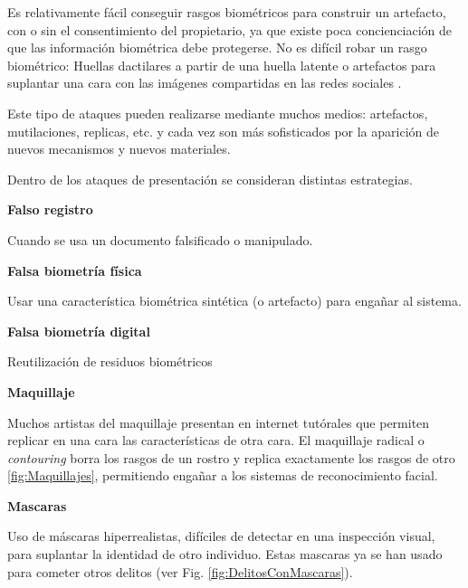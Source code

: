 Es relativamente fácil conseguir rasgos biométricos para construir un artefacto, con o sin el consentimiento del propietario, ya que existe poca concienciación de que las información biométrica debe protegerse. No es difícil robar un rasgo biométrico: Huellas dactilares a partir de una huella latente o artefactos para suplantar una cara con las imágenes compartidas en las redes sociales \cite{xu2016virtual}.

Este tipo de ataques pueden realizarse mediante muchos medios: artefactos, mutilaciones, replicas, etc. y cada vez son más sofisticados por la aparición de nuevos mecanismos y nuevos materiales.

Dentro de los ataques de presentación se consideran distintas estrategias.

\textbf{Falso registro}

Cuando se usa un documento falsificado o manipulado. 

\textbf{Falsa biometría física}

Usar una característica biométrica sintética (o artefacto) para engañar al sistema.

\textbf{Falsa biometría digital}

Reutilización de residuos biométricos 

\textbf{Maquillaje}

 Muchos artistas del maquillaje presentan en internet tutórales que permiten replicar en una cara las características de otra cara. El maquillaje radical o \textit{contouring} borra los rasgos de un rostro y replica exactamente los rasgos de otro \ref{fig:Maquillajes}, permitiendo engañar a los sistemas de reconocimiento \gls{facial}.  

\textbf{Mascaras}

Uso de máscaras hiperrealistas, difíciles de detectar en una inspección visual, para suplantar la identidad de otro individuo. Estas mascaras ya se han usado para cometer otros delitos (ver Fig. \ref{fig:DelitosConMascaras}).





